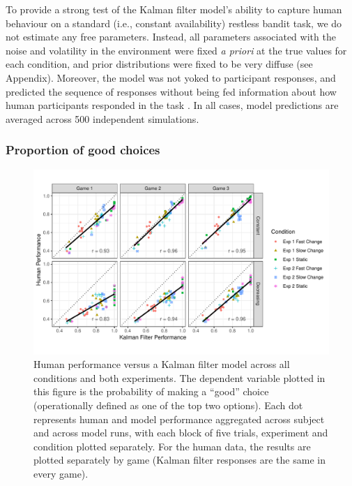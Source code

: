 \documentclass[a4paper,doc,natbib]{apa6}
\begin{document}
 To provide a strong test of the Kalman filter model's ability to capture human behaviour on a standard (i.e., constant availability) restless bandit task, we do not estimate any free parameters. Instead, all parameters associated with the noise and volatility in the environment were fixed {\it a priori} at the true values for each condition, and prior distributions were fixed to be very diffuse (see Appendix). Moreover, the model was not yoked to participant responses, and predicted the sequence of responses without being fed information about how human participants responded in the task \citep[e.g.,][]{yechiam2005comparison,steingroever2014absolute}. In all cases, model predictions are averaged across 500 independent simulations.

\subsubsection{Proportion of good choices}



\begin{figure}[t]
\centering
\includegraphics[width=.95\textwidth]{modelvshuman.pdf}
\caption{\small{Human performance versus a Kalman filter model across all conditions and both experiments. The dependent variable plotted in this figure is the probability of making a ``good'' choice (operationally defined as one of the top two options). Each dot represents human and model performance aggregated across subject and across model runs, with each block of five trials, experiment and condition plotted separately. For the human data, the results are plotted separately by game (Kalman filter responses are the same in every game).}}
\label{fig:modelhuman}
\end{figure}
\end{document}
